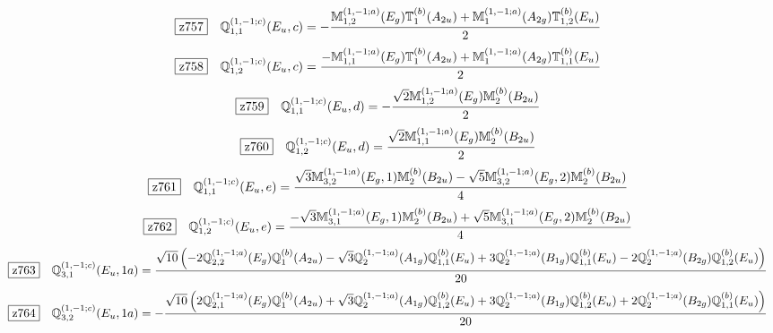 \documentclass[fleqn,10pt,landscape]{jsarticle}
\begin{document}
\begin{dmath*}
\hspace*{3mm}\fbox{z757}\quad \mathbb{Q}_{1,1}^{(1,-1;c)}(E_{u},c)=- \frac{\mathbb{M}_{1,2}^{(1,-1;a)}(E_{g}) \mathbb{T}_{1}^{(b)}(A_{2u}) + \mathbb{M}_{1}^{(1,-1;a)}(A_{2g}) \mathbb{T}_{1,2}^{(b)}(E_{u})}{2}
\end{dmath*}
\begin{dmath*}
\hspace*{3mm}\fbox{z758}\quad \mathbb{Q}_{1,2}^{(1,-1;c)}(E_{u},c)=\frac{- \mathbb{M}_{1,1}^{(1,-1;a)}(E_{g}) \mathbb{T}_{1}^{(b)}(A_{2u}) + \mathbb{M}_{1}^{(1,-1;a)}(A_{2g}) \mathbb{T}_{1,1}^{(b)}(E_{u})}{2}
\end{dmath*}
\begin{dmath*}
\hspace*{3mm}\fbox{z759}\quad \mathbb{Q}_{1,1}^{(1,-1;c)}(E_{u},d)=- \frac{\sqrt{2} \mathbb{M}_{1,2}^{(1,-1;a)}(E_{g}) \mathbb{M}_{2}^{(b)}(B_{2u})}{2}
\end{dmath*}
\begin{dmath*}
\hspace*{3mm}\fbox{z760}\quad \mathbb{Q}_{1,2}^{(1,-1;c)}(E_{u},d)=\frac{\sqrt{2} \mathbb{M}_{1,1}^{(1,-1;a)}(E_{g}) \mathbb{M}_{2}^{(b)}(B_{2u})}{2}
\end{dmath*}
\begin{dmath*}
\hspace*{3mm}\fbox{z761}\quad \mathbb{Q}_{1,1}^{(1,-1;c)}(E_{u},e)=\frac{\sqrt{3} \mathbb{M}_{3,2}^{(1,-1;a)}(E_{g},1) \mathbb{M}_{2}^{(b)}(B_{2u}) - \sqrt{5} \mathbb{M}_{3,2}^{(1,-1;a)}(E_{g},2) \mathbb{M}_{2}^{(b)}(B_{2u})}{4}
\end{dmath*}
\begin{dmath*}
\hspace*{3mm}\fbox{z762}\quad \mathbb{Q}_{1,2}^{(1,-1;c)}(E_{u},e)=\frac{- \sqrt{3} \mathbb{M}_{3,1}^{(1,-1;a)}(E_{g},1) \mathbb{M}_{2}^{(b)}(B_{2u}) + \sqrt{5} \mathbb{M}_{3,1}^{(1,-1;a)}(E_{g},2) \mathbb{M}_{2}^{(b)}(B_{2u})}{4}
\end{dmath*}
\begin{dmath*}
\hspace*{3mm}\fbox{z763}\quad \mathbb{Q}_{3,1}^{(1,-1;c)}(E_{u},1a)=\frac{\sqrt{10} \left(- 2 \mathbb{Q}_{2,2}^{(1,-1;a)}(E_{g}) \mathbb{Q}_{1}^{(b)}(A_{2u}) - \sqrt{3} \mathbb{Q}_{2}^{(1,-1;a)}(A_{1g}) \mathbb{Q}_{1,1}^{(b)}(E_{u}) + 3 \mathbb{Q}_{2}^{(1,-1;a)}(B_{1g}) \mathbb{Q}_{1,1}^{(b)}(E_{u}) - 2 \mathbb{Q}_{2}^{(1,-1;a)}(B_{2g}) \mathbb{Q}_{1,2}^{(b)}(E_{u})\right)}{20}
\end{dmath*}
\begin{dmath*}
\hspace*{3mm}\fbox{z764}\quad \mathbb{Q}_{3,2}^{(1,-1;c)}(E_{u},1a)=- \frac{\sqrt{10} \left(2 \mathbb{Q}_{2,1}^{(1,-1;a)}(E_{g}) \mathbb{Q}_{1}^{(b)}(A_{2u}) + \sqrt{3} \mathbb{Q}_{2}^{(1,-1;a)}(A_{1g}) \mathbb{Q}_{1,2}^{(b)}(E_{u}) + 3 \mathbb{Q}_{2}^{(1,-1;a)}(B_{1g}) \mathbb{Q}_{1,2}^{(b)}(E_{u}) + 2 \mathbb{Q}_{2}^{(1,-1;a)}(B_{2g}) \mathbb{Q}_{1,1}^{(b)}(E_{u})\right)}{20}
\end{dmath*}
\end{document}
